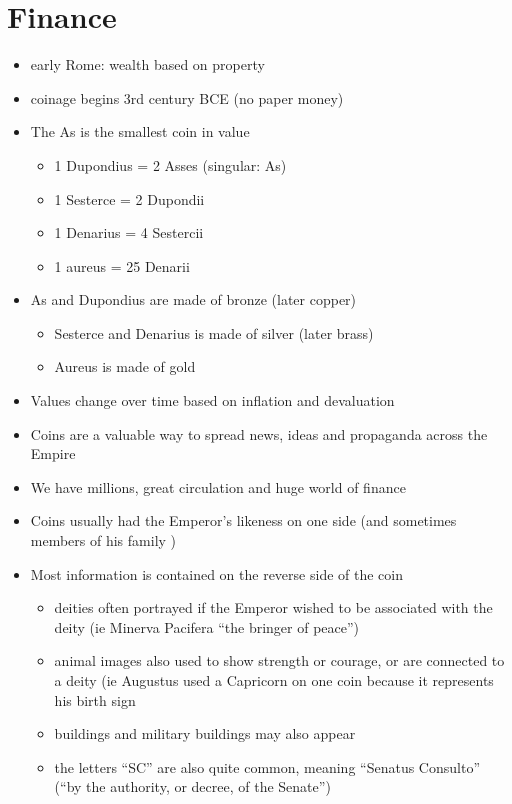 \documentclass[12pt, twoside]{article}
\begin{document}
\section{Finance}
\begin{itemize}
\item early Rome: wealth based on property
\item coinage begins 3rd century BCE (no paper money)
\item The As is the smallest coin in value
	\begin{itemize}
	\item 1 Dupondius = 2 Asses (singular: As)
	\item 1 Sesterce = 2 Dupondii
	\item 1 Denarius = 4 Sestercii
	\item 1 aureus = 25 Denarii
	\end{itemize}
\item As and Dupondius are made of bronze (later copper)
	\begin{itemize}
	\item Sesterce and Denarius is made of silver (later brass)
	\item Aureus is made of gold 
	\end{itemize}
\item Values change over time based on inflation and devaluation
\item Coins are a valuable way to spread news, ideas and propaganda across the Empire
\item We have millions, great circulation and huge world of finance
\item Coins usually had the Emperor’s likeness on one side (and sometimes members of his family )
\item Most information is contained on the reverse side of the coin
	\begin{itemize}
	\item deities often portrayed if the Emperor wished to be associated with the deity (ie Minerva Pacifera “the bringer of peace”)
	\item animal images also used to show strength or courage, or are connected to a deity (ie Augustus used a Capricorn on one coin because it represents his birth sign
	\item buildings and military buildings may also appear
	\item the letters “SC” are also quite common, meaning “Senatus Consulto” (“by the authority, or decree, of the Senate”)
	\end{itemize}
\end{itemize}
\end{document}
